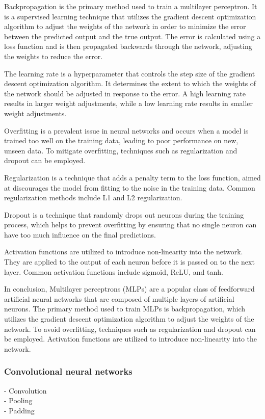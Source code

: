 Backpropagation is the primary method used to train a multilayer perceptron. It is a supervised learning technique that utilizes the gradient descent optimization algorithm to adjust the weights of the network in order to minimize the error between the predicted output and the true output. The error is calculated using a loss function and is then propagated backwards through the network, adjusting the weights to reduce the error.

The learning rate is a hyperparameter that controls the step size of the gradient descent optimization algorithm. It determines the extent to which the weights of the network should be adjusted in response to the error. A high learning rate results in larger weight adjustments, while a low learning rate results in smaller weight adjustments.

Overfitting is a prevalent issue in neural networks and occurs when a model is trained too well on the training data, leading to poor performance on new, unseen data. To mitigate overfitting, techniques such as regularization and dropout can be employed.

Regularization is a technique that adds a penalty term to the loss function, aimed at discourages the model from fitting to the noise in the training data. Common regularization methods include L1 and L2 regularization.

Dropout is a technique that randomly drops out neurons during the training process, which helps to prevent overfitting by ensuring that no single neuron can have too much influence on the final predictions.

Activation functions are utilized to introduce non-linearity into the network. They are applied to the output of each neuron before it is passed on to the next layer. Common activation functions include sigmoid, ReLU, and tanh.

In conclusion, Multilayer perceptrons (MLPs) are a popular class of feedforward artificial neural networks that are composed of multiple layers of artificial neurons. The primary method used to train MLPs is backpropagation, which utilizes the gradient descent optimization algorithm to adjust the weights of the network. To avoid overfitting, techniques such as regularization and dropout can be employed. Activation functions are utilized to introduce non-linearity into the network.



\subsubsection{Convolutional neural networks}
- Convolution\\
- Pooling\\
- Padding\\

